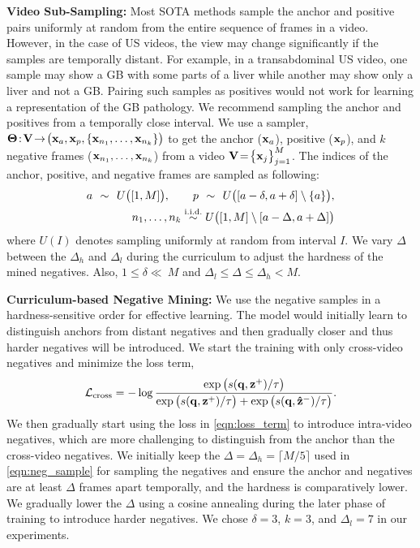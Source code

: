 \documentclass[runningheads]{llncs}
\newcommand{\myfirstpara}[1]{\par \noindent \textbf{#1:}}
\newcommand{\mypara}[1]{ \myfirstpara{#1}}
\begin{document}
\mypara{Video Sub-Sampling}
%
Most SOTA methods sample the anchor and positive pairs uniformly at random from the entire sequence of frames in a video. However, in the case of US videos, the view may change significantly if the samples are temporally distant. For example, in a transabdominal US video, one sample may show a GB with some parts of a liver while another may show only a liver and not a GB. Pairing such samples as positives would not work for learning a representation of the GB pathology. We recommend sampling the anchor and positives from a temporally close interval. We use a sampler, $\vb{\Theta}\!:\!\vb{V}\!\rightarrow\!\big(\vb{x}_a, \vb{x}_p, \{\vb{x}_{n_1}, \ldots, \vb{x}_{n_k}\}\big)$ to get the anchor ($\vb{x}_a$), positive ($\vb{x}_p$), and $k$ negative frames ($\vb{x}_{n_1}, \ldots, \vb{x}_{n_k}$) from a video $\vb{V}\!=\!\big\{ \vb{x}_j\big\}_{j=1}^M$. The indices of the anchor, positive, and negative frames are sampled as following: 
%
\begin{align*}
a \overset{\hphantom{\text{i.i.d.}}}{\sim} U\big([1,M]\big), 
\qquad
p \overset{\hphantom{\text{i.i.d.}}}{\sim} U\big([a-\delta, a+\delta] \setminus \{a\}\big), 
\\ 
n_1, \ldots, n_k \overset{\text{i.i.d.}}{\sim} U\big([1,M] \setminus [a-\Delta,a+\Delta]\big)
\label{eqn:neg_sample}
\end{align*} 
%
where $U(I)$ denotes sampling uniformly at random from interval $I$. We vary $\Delta$ between the $\Delta_h$ and $\Delta_l$ during the curriculum to adjust the hardness of the mined negatives. Also, $1 \le \delta \ll\ \!M$ and $ \Delta_{l} \le \Delta \le \Delta_{h} < M$. 

\mypara{Curriculum-based Negative Mining}
%
We use the negative samples in a hardness-sensitive order for effective learning. The model would initially learn to distinguish anchors from distant negatives and then gradually closer and thus harder negatives will be introduced. We start the training with only cross-video negatives and minimize the loss term, 
%
\begin{align}
    \mathcal{L}_{\text{cross}} = -\log \frac{\exp\big(s(\vb{q}, \vb{z}^+)/\tau\big)}{\exp\big(s(\vb{q}, \vb{z}^+)/\tau\big) + \exp\big(s(\vb{q}, \vb{\hat{z}}^-)/\tau\big)}.
\end{align}
We then gradually start using the loss in \cref{eqn:loss_term} to introduce intra-video negatives, which are more challenging to distinguish from the anchor than the cross-video negatives. We initially keep the $\Delta= \Delta_h =\lceil M/5\rceil$ used in \cref{eqn:neg_sample} for sampling the negatives and ensure the anchor and negatives are at least $\Delta$ frames apart temporally, and the hardness is comparatively lower. We gradually lower the $\Delta$ using a cosine annealing during the later phase of training to introduce harder negatives. We chose $\delta=3$, $k=3$, and  $\Delta_l=7$ in our experiments.
\end{document}
